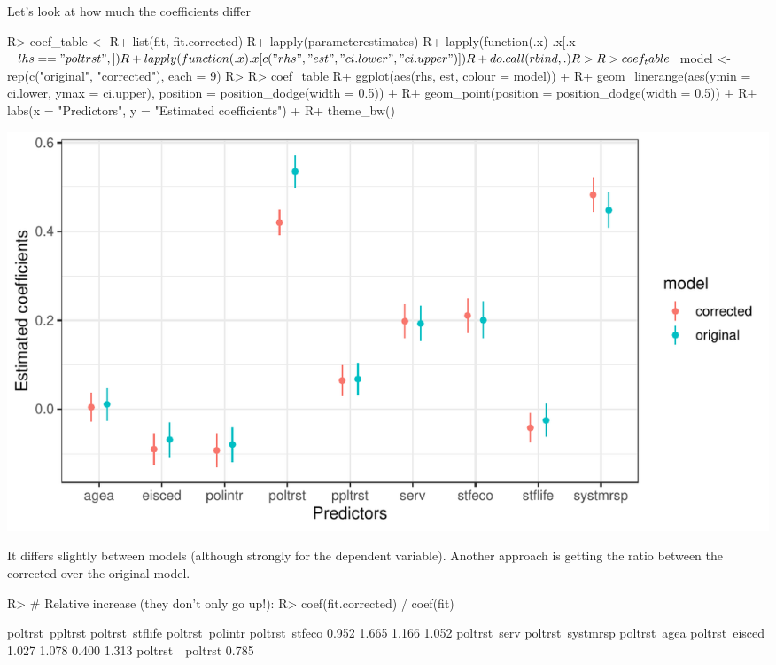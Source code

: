 \documentclass[
]{jss}
\begin{document}
Let's look at how much the coefficients differ

\begin{CodeChunk}

\begin{CodeInput}
R> coef_table <-
R+   list(fit, fit.corrected) %
R+   lapply(parameterestimates) %
R+   lapply(function(.x) .x[.x$lhs == "poltrst", ]) %
R+   lapply(function(.x) .x[c("rhs", "est", "ci.lower", "ci.upper")]) %
R+   do.call(rbind, .)
R> 
R> coef_table$model <- rep(c("original", "corrected"), each = 9)
R> 
R> coef_table %
R+   ggplot(aes(rhs, est, colour = model)) +
R+   geom_linerange(aes(ymin = ci.lower, ymax = ci.upper), position = position_dodge(width = 0.5)) +
R+   geom_point(position = position_dodge(width = 0.5)) +
R+   labs(x = "Predictors", y = "Estimated coefficients") +
R+   theme_bw()
\end{CodeInput}


\begin{center}\includegraphics{measurementerror_paper_files/figure-latex/unnamed-chunk-21-1} \end{center}

\end{CodeChunk}

It differs slightly between models (although strongly for the dependent
variable). Another approach is getting the ratio between the corrected
over the original model.

\begin{CodeChunk}

\begin{CodeInput}
R> # Relative increase (they don't only go up!):
R> coef(fit.corrected) / coef(fit)
\end{CodeInput}

\begin{CodeOutput}
 poltrst~ppltrst  poltrst~stflife  poltrst~polintr   poltrst~stfeco 
           0.952            1.665            1.166            1.052 
    poltrst~serv poltrst~systmrsp     poltrst~agea   poltrst~eisced 
           1.027            1.078            0.400            1.313 
poltrst~~poltrst 
           0.785 
\end{CodeOutput}
\end{CodeChunk}
\end{document}
